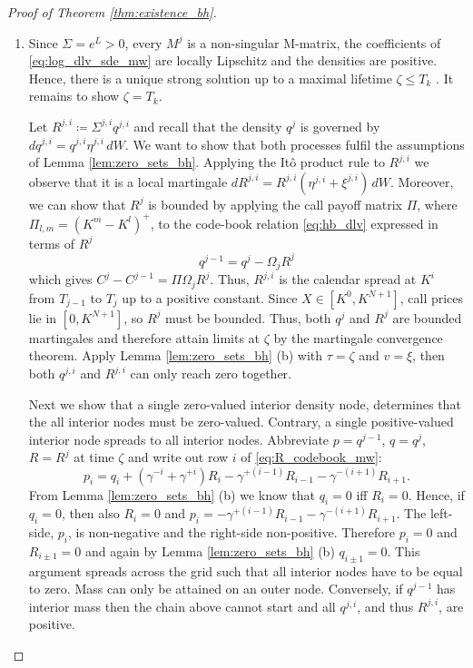 \documentclass[11pt]{article}
\theoremstyle{plain}
\theoremstyle{definition}
\theoremstyle{remark}
\begin{document}
\begin{proof}[Proof of Theorem \ref{thm:existence_bh}]
\begin{enumerate}[label=(\roman*)]
  \item Since $\Sigma = e^L > 0$, every $ M^j $ is a non-singular M-matrix, the coefficients of \eqref{eq:log_dlv_sde_mw} are locally Lipschitz and the densities are positive. Hence, there is a unique strong solution up to a maximal lifetime $\zeta \leq T_k$ \cite[Theorem~V.38]{Protter2005}. It remains to show $\zeta = T_k$.
  
  
  Let $R^{j, i} \coloneqq \Sigma^{j, i} q^{j, i}$ and recall that the density $q^{j}$ is governed by $dq^{j, i} = q^{j, i} \eta^{j, i} \, dW$. We want to show that both processes fulfil the assumptions of Lemma \ref{lem:zero_sets_bh}. Applying the Itô product rule to $R^{j, i}$ we observe that it is a local martingale $dR^{j,i} = R^{j,i} ( \eta^{j,i}+\xi^{j,i} ) \, dW$. Moreover, we can show that $R^j$ is bounded by applying the call payoff matrix $\Pi$, where $\Pi_{l, m} = (K^m - K^l)^+$, to the code-book relation \eqref{eq:hb_dlv} expressed in terms of $R^j$
  \begin{equation}
    \label{eq:R_codebook_mw}
    q^{j-1}=q^j - \Omega_jR^j 
  \end{equation}
  which gives $C^{j} - C^{j-1} = \Pi\Omega_j R^j $. Thus, $R^{j, i}$ is the calendar spread at $K^{i}$ from $T_{j-1}$ to $T_j$ up to a positive constant. Since $X \in [K^0, K^{N+1}]$, call prices lie in $[0, K^{N+1}]$, so $R^{j}$ must be bounded. Thus, both $q^j$ and $R^j$ are bounded martingales and therefore attain limits at $\zeta$ by the martingale convergence theorem. Apply Lemma \ref{lem:zero_sets_bh} (b) with $\tau=\zeta$ and $v=\xi$, then both $q^{j, i}$ and $R^{j, i}$ can only reach zero together. 

  Next we show that a single zero-valued interior density node, determines that the all interior nodes must be zero-valued. Contrary, a single positive-valued interior node spreads to all interior nodes. Abbreviate $p=q^{j-1}$, $q=q^j$, $R=R^j$ at time $\zeta$ and write out row $i$ of \eqref{eq:R_codebook_mw}: 
  \begin{equation*}
    p_i = q_i+( \gamma^{-i} + \gamma^{+i} ) R_i - \gamma^{ +(i-1)} R_{i-1} - \gamma^{ -(i+1)} R_{i+1}.
  \end{equation*}
  From Lemma \ref{lem:zero_sets_bh} (b) we know that $q_i = 0$ iff $R_i = 0$. Hence, if $q_i = 0$, then also $R_i = 0$ and $p_i = - \gamma^{ +(i-1)} R_{i-1} - \gamma^{ -(i+1)} R_{i+1}$. The left-side, $p_i$, is non-negative and the right-side non-positive. Therefore $p_i = 0$ and $R_{i\pm1} = 0$ and again by Lemma \ref{lem:zero_sets_bh} (b) $q_{i\pm1} = 0$. This argument spreads across the grid such that all interior nodes have to be equal to zero. Mass can only be attained on an outer node. Conversely, if $q^{j-1}$ has interior mass then the chain above cannot start and all $q^{j, i}$, and thus $R^{j, i}$, are positive. 


\end{enumerate}
\end{proof}
\end{document}
